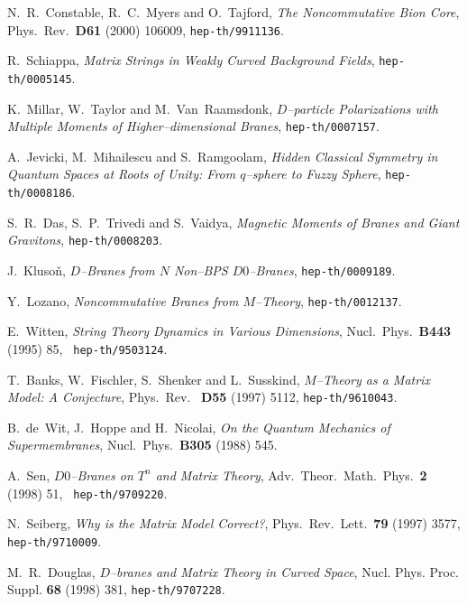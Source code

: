 \documentclass[a4paper,11pt]{article}
\begin{document}
\begin{thebibliography}{99}
{  {\small N.~R.~Constable, R.~C.~Myers and O.~Tajford, \textit{
The Noncommutative Bion Core}, Phys.\ Rev.\ \textbf{D61} (2000) 106009, 
\texttt{hep-th/9911136}. }

  {\small R.~Schiappa, \textit{Matrix Strings in Weakly
Curved Background Fields}, \texttt{hep-th/0005145}. }

  {\small K.~Millar, W.~Taylor and M.~Van~Raamsdonk, \textit{
$D$--particle Polarizations with Multiple Moments of Higher--dimensional 
Branes}, \texttt{hep-th/0007157}. }

  {\small A.~Jevicki, M.~Mihailescu and S.~Ramgoolam, \textit{
Hidden Classical Symmetry in Quantum Spaces at Roots of Unity: From 
$q$--sphere to Fuzzy Sphere}, \texttt{hep-th/0008186}. }

  {\small S.~R.~Das, S.~P.~Trivedi and S.~Vaidya, \textit{
Magnetic Moments of Branes and Giant Gravitons}, \texttt{hep-th/0008203}. }

  {\small J.~Kluso\v{n}, \textit{$D$--Branes from $N$
Non--BPS $D0$--Branes}, \texttt{hep-th/0009189}. }

  {\small Y.~Lozano, \textit{Noncommutative Branes 
from $M$--Theory}, \texttt{hep-th/0012137}. }

  {\small E.~Witten, \textit{String Theory Dynamics in
Various Dimensions}, Nucl.\ Phys.\ \textbf{B443} (1995) 85, \texttt{
hep-th/9503124}. }

  {\small T.~Banks, W.~Fischler, S.~Shenker and L.~Susskind, 
\textit{$M$--Theory as a Matrix Model: A Conjecture}, Phys.\ Rev.\ \textbf{
D55} (1997) 5112, \texttt{hep-th/9610043}. }

  {\small B.~de~Wit, J.~Hoppe and H.~Nicolai, \textit{On the
Quantum Mechanics of Supermembranes}, Nucl.\ Phys.\ \textbf{B305} (1988)
545. }

  {\small A.~Sen, \textit{$D0$--Branes on $T^n$ and Matrix
Theory}, Adv.\ Theor.\ Math.\ Phys.\ \textbf{2} (1998) 51, \texttt{
hep-th/9709220}. }

  {\small N.~Seiberg, \textit{Why is the Matrix Model
Correct?}, Phys.\ Rev.\ Lett.\ \textbf{79} (1997) 3577, \texttt{
hep-th/9710009}. }

  {\small M.~R.~Douglas, \textit{$D$--branes and
Matrix Theory in Curved Space}, Nucl. Phys. Proc. Suppl. \textbf{68} (1998)
381, \texttt{hep-th/9707228}. }

}
\end{thebibliography}
\end{document}
